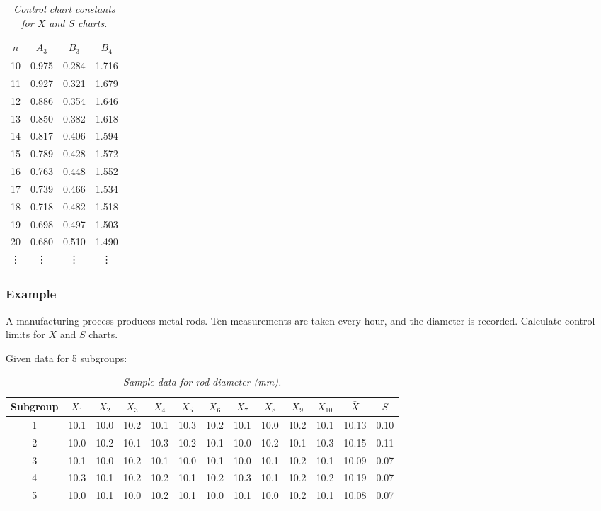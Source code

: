 \documentclass[twoside]{book}
\begin{document}
\begin{table}[H]
\centering
\begin{tabular}{c|ccc}
\toprule
$n$ & $A_3$ & $B_3$ & $B_4$ \\
\midrule
10 & 0.975 & 0.284 & 1.716 \\
11 & 0.927 & 0.321 & 1.679 \\
12 & 0.886 & 0.354 & 1.646 \\
13 & 0.850 & 0.382 & 1.618 \\
14 & 0.817 & 0.406 & 1.594 \\
15 & 0.789 & 0.428 & 1.572 \\
16 & 0.763 & 0.448 & 1.552 \\
17 & 0.739 & 0.466 & 1.534 \\
18 & 0.718 & 0.482 & 1.518 \\
19 & 0.698 & 0.497 & 1.503 \\
20 & 0.680 & 0.510 & 1.490 \\
\vdots & \vdots & \vdots & \vdots \\
\bottomrule
\end{tabular}
\caption{\textit{Control chart constants for $\overline{X}$ and $S$ charts.}}
\label{table:xbar-s-cc}
\end{table}

\subsubsection{Example}

A manufacturing process produces metal rods. Ten measurements are taken every hour, and the diameter is recorded. Calculate control limits for $\overline{X}$ and $S$ charts.

Given data for 5 subgroups:
\begin{table}[H]
\centering
\small
\begin{tabular}{c|cccccccccc|c|c}
\toprule
\textbf{Subgroup} & $X_1$ & $X_2$ & $X_3$ & $X_4$ & $X_5$ & $X_6$ & $X_7$ & $X_8$ & $X_9$ & $X_{10}$ & $\bar{X}$ & $S$ \\
\midrule
1 & 10.1 & 10.0 & 10.2 & 10.1 & 10.3 & 10.2 & 10.1 & 10.0 & 10.2 & 10.1 & 10.13 & 0.10 \\
2 & 10.0 & 10.2 & 10.1 & 10.3 & 10.2 & 10.1 & 10.0 & 10.2 & 10.1 & 10.3 & 10.15 & 0.11 \\
3 & 10.1 & 10.0 & 10.2 & 10.1 & 10.0 & 10.1 & 10.0 & 10.1 & 10.2 & 10.1 & 10.09 & 0.07 \\
4 & 10.3 & 10.1 & 10.2 & 10.2 & 10.1 & 10.2 & 10.3 & 10.1 & 10.2 & 10.2 & 10.19 & 0.07 \\
5 & 10.0 & 10.1 & 10.0 & 10.2 & 10.1 & 10.0 & 10.1 & 10.0 & 10.2 & 10.1 & 10.08 & 0.07 \\
\bottomrule
\end{tabular}
\caption{\textit{Sample data for rod diameter (mm).}}
\end{table}
\end{document}
